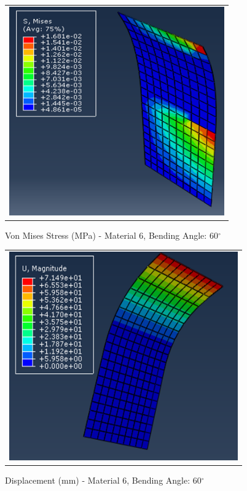 \documentclass[a4paper,12pt]{article}
\numberwithin{equation}{section}
\numberwithin{figure}{section}
\begin{document}
\begin{figure}[H]
  \centering
  \begin{tabular}{@{}c@{}}
    \includegraphics[width=0.7\linewidth,height=255pt]{Results/Bending/M6_VMS_60_new.png} \\
  \end{tabular}
  \caption{Von Mises Stress (MPa) - Material 6,  Bending Angle: 60$^{\circ}$ }
\end{figure}

\begin{figure}[H]
  \centering
  \begin{tabular}{@{}c@{}}
    \includegraphics[width=0.7\linewidth,height=255pt]{Results/Bending/M6_DIS_60_new.png} \\
  \end{tabular}
  \caption{Displacement (mm) - Material 6, Bending Angle: 60$^{\circ}$ }
\end{figure}
\end{document}
